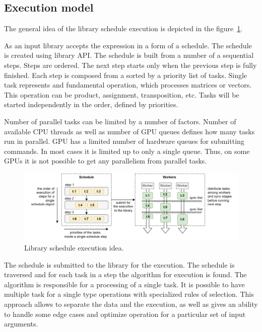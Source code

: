 \subsection{Execution model}

The general idea of the library schedule execution is depicted in the figure~\ref{fig:execution_schema}.

As an input library accepts the expression in a form of a schedule. The schedule is created using library API. The schedule is built from a number of a sequential steps. Steps are ordered. The next step starts only when the previous step is fully finished. Each step is composed from a sorted by a priority list of tasks. Single task represents and fundamental operation, which processes matrices or vectors. This operation can be product, assignment, transposition, etc. Tasks will be started independently in the order, defined by priorities. 

Number of parallel tasks can be limited by a number of factors. Number of available CPU threads as well as number of GPU queues defines how many tasks run in parallel. GPU has a limited number of hardware queues for submitting commands. In most cases it is limited up to only a single queue. Thus, on some GPUs it is not possible to get any parallelism from parallel tasks.  

\begin{figure}[ht]
    \centering
    \includegraphics[width=1.0\textwidth]{images/spla_scheduling.png}
    \caption{Library schedule execution idea.}
    \label{fig:execution_schema}
\end{figure}

The schedule is submitted to the library for the execution. The schedule is traversed and for each task in a step the algorithm for execution is found. The algorithm is responsible for a processing of a single task. It is possible to have multiple task for a single type operations with specialized rules of selection. This approach allows to separate the data and the execution, as well as gives an ability to handle some edge cases and optimize operation for a particular set of input arguments.

